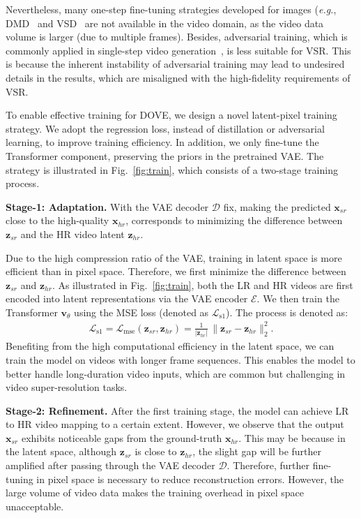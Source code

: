 \documentclass{article}
\newcommand\eg{\textit{e.g.}}
\begin{document}
Nevertheless, many one-step fine-tuning strategies developed for images (\eg, DMD~\cite{yin2024one} and VSD~\cite{wang2023prolificdreamer} are not available in the video domain, as the video data volume is larger (due to multiple frames). Besides, adversarial training, which is commonly applied in single-step video generation~\cite{zhang2024sf,lin2025diffusion}, is less suitable for VSR. This is because the inherent instability of adversarial training may lead to undesired details in the results, which are misaligned with the high-fidelity requirements of VSR.

To enable effective training for DOVE, we design a novel latent-pixel training strategy. We adopt the regression loss, instead of distillation or adversarial learning, to improve training efficiency. In addition, we only fine-tune the Transformer component, preserving the priors in the pretrained VAE. The strategy is illustrated in Fig.~\ref{fig:train}, which consists of a two-stage training process. 

\textbf{Stage-1: Adaptation.}
With the VAE decoder $\mathcal{D}$ fix, making the predicted $\mathbf{x}_{sr}$ close to the high-quality $\mathbf{x}_{hr}$, corresponds to minimizing the difference between $\mathbf{z}_{sr}$ and the HR video latent $\mathbf{z}_{hr}$. 

Due to the high compression ratio of the VAE, training in latent space is more efficient than in pixel space. Therefore, we first minimize the difference between $\mathbf{z}_{sr}$ and $\mathbf{z}_{hr}$. As illustrated in Fig.~\ref{fig:train}, both the LR and HR videos are first encoded into latent representations via the VAE encoder $\mathcal{E}$. We then train the Transformer $\mathbf{v}_\theta$ using the MSE loss (denoted as $\mathcal{L}_{\text {s1}}$). The process is denoted as:
\begin{equation}
\begin{gathered}
\mathcal{L}_{\text{s1}} = \mathcal{L}_{\text{mse}}(\mathbf{z}_{sr}, \mathbf{z}_{hr}) = \frac{1}{\lvert\mathbf{z}_{hr}\rvert} \,
\bigl\|
\mathbf{z}_{sr}-\mathbf{z}_{hr}
\bigr\|_{2}^{2}.
\end{gathered}
\end{equation}
Benefiting from the high computational efficiency in the latent space, we can train the model on videos with longer frame sequences. This enables the model to better handle long-duration video inputs, which are common but challenging in video super-resolution tasks.

\textbf{Stage-2: Refinement.}
After the first training stage, the model can achieve LR to HR video mapping to a certain extent. However, we observe that the output $\mathbf{x}_{sr}$ exhibits noticeable gaps from the ground-truth $\mathbf{x}_{hr}$. This may be because in the latent space, although $\mathbf{z}_{sr}$ is close to $\mathbf{z}_{hr}$, the slight gap will be further amplified after passing through the VAE decoder $\mathcal{D}$. Therefore, further fine-tuning in pixel space is necessary to reduce reconstruction errors. 
However, the large volume of video data makes the training overhead in pixel space unacceptable.
\end{document}
